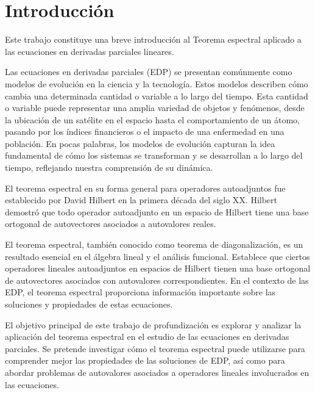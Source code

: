 \documentclass{article}
\begin{document}
\newpage


\section{Introducción}
Este trabajo constituye una breve introducción al Teorema espectral aplicado a las ecuaciones en derivadas parciales lineares.

Las ecuaciones en derivadas parciales (EDP) se presentan comúnmente como modelos de evolución en la ciencia y la tecnología. Estos modelos describen cómo cambia una determinada cantidad o variable a lo largo del tiempo. Esta cantidad o variable puede representar una amplia variedad de objetos y fenómenos, desde la ubicación de un satélite en el espacio hasta el comportamiento de un átomo, pasando por los índices financieros o el impacto de una enfermedad en una población. En pocas palabras, los modelos de evolución capturan la idea fundamental de cómo los sistemas se transforman y se desarrollan a lo largo del tiempo, reflejando nuestra comprensión de su dinámica.

El teorema espectral en su forma general para operadores autoadjuntos fue establecido por David Hilbert en la primera década del siglo XX. Hilbert demostró que todo operador autoadjunto en un espacio de Hilbert tiene una base ortogonal de autovectores asociados a autovalores reales.

El teorema espectral, también conocido como teorema de diagonalización, es un resultado esencial en el álgebra lineal y el análisis funcional. Establece que ciertos operadores lineales autoadjuntos en espacios de Hilbert tienen una base ortogonal de autovectores asociados con autovalores correspondientes. En el contexto de las EDP, el teorema espectral proporciona información importante sobre las soluciones y propiedades de estas ecuaciones.

El objetivo principal de este trabajo de profundización es explorar y analizar la aplicación del teorema espectral en el estudio de las ecuaciones en derivadas parciales. Se pretende investigar cómo el teorema espectral puede utilizarse para comprender mejor las propiedades de las soluciones de EDP, así como para abordar problemas de autovalores asociados a operadores lineales involucrados en las ecuaciones.

\newpage
\end{document}
